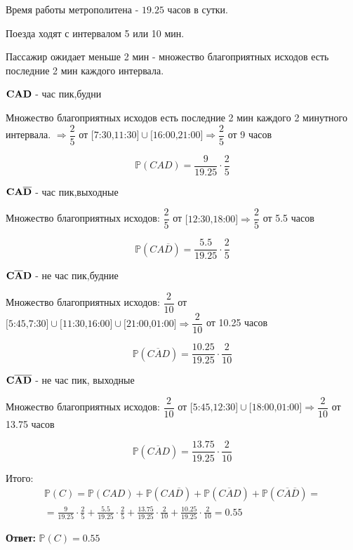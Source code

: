 \documentclass[a4paper,12pt]{article}
\newcommand{\fr}{\frac}
\newcommand{\dfr}{\dfrac}
\newcommand{\ol}{\overline}
\newcommand{\bb}{\mathbb}
\begin{document}
Время работы метрополитена - $19.25$ часов в сутки.

Поезда ходят с интервалом 5 или 10 мин.

Пассажир ожидает меньше 2 мин - множество благоприятных исходов есть последние 2 мин каждого интервала.

\vspace{\baselineskip}

$\bf CAD$ - час пик,будни

Множество благоприятных исходов есть последние 2 мин каждого 2 минутного интервала. $\Rightarrow \dfr{2}{5}$ от $\text{[7:30,11:30]}\cup \text{[16:00,21:00]} \Rightarrow \dfr{2}{5}$ от 9 часов

$$\bb P(CAD) = \fr{9}{19.25}\cdot\fr{2}{5}$$

$\bf CA\ol D$ - час пик,выходные

Множество благоприятных исходов: $\dfr{2}{5}$ от $\text{[12:30,18:00]} \Rightarrow \dfr{2}{5}$ от 5.5 часов

$$\bb P(CA\ol D) = \fr{5.5}{19.25}\cdot\fr{2}{5}$$

\vspace{\baselineskip}

$\bf C\ol AD$ - не час пик,будние

Множество благоприятных исходов: $\dfr{2}{10}$ от $\text{[5:45,7:30]}\cup \text{[11:30,16:00]}\cup \text{[21:00,01:00]} \Rightarrow \dfr{2}{10}$ от 10.25 часов

$$\bb P(C\ol AD) = \fr{10.25}{19.25}\cdot\fr{2}{10}$$

\vspace{\baselineskip}

$\bf C\ol A \ol D$ - не час пик, выходные

Множество благоприятных исходов: $\dfr{2}{10}$ от $\text{[5:45,12:30]}\cup \text{[18:00,01:00]} \Rightarrow \dfr{2}{10}$ от 13.75 часов

$$\bb P(C\ol AD) = \fr{13.75}{19.25}\cdot\fr{2}{10}$$

\vspace{\baselineskip}

Итого:
\begin{multline}
\bb P(C) = \bb P(CAD) +\bb P(CA\ol D) + \bb P(C\ol A D) +\bb P(C\ol A \ol D)=\\=
\fr{9}{19.25}\cdot\fr{2}{5} + \fr{5.5}{19.25}\cdot\fr{2}{5} + \fr{13.75}{19.25}\cdot\fr{2}{10}+ \fr{10.25}{19.25}\cdot\fr{2}{10} = 0.55 
\end{multline}

\textbf{Ответ:} $\bb P(C) = 0.55$
\end{document}
